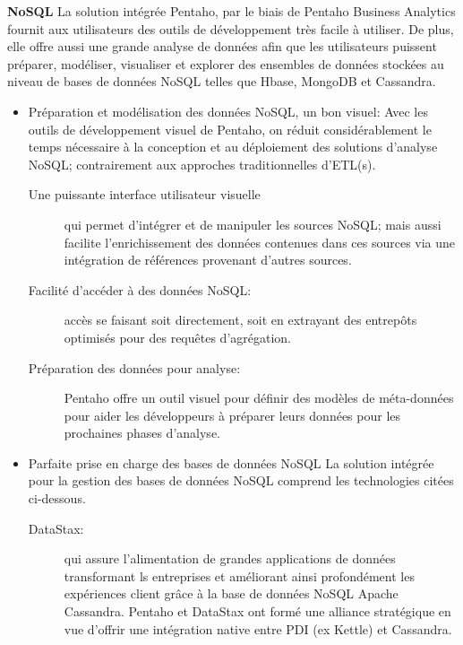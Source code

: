 \documentclass[12pt,a4wide,twoside]{report}
\begin{document}
 \textbf{NoSQL \newline}
 La solution intégrée Pentaho, par le biais de Pentaho Business Analytics fournit aux utilisateurs des outils de développement très facile à utiliser. De plus, elle offre aussi une grande analyse de données afin que les utilisateurs puissent préparer, modéliser, visualiser et explorer des ensembles de données stockées au niveau de bases de données NoSQL telles que Hbase, MongoDB et Cassandra.
 \begin{itemize}
 	\item Préparation et modélisation des données NoSQL, un bon visuel: \newline
 	Avec les outils de développement visuel de Pentaho, on réduit considérablement le temps nécessaire à la conception et au déploiement des solutions d'analyse NoSQL; contrairement aux approches traditionnelles d'ETL(s).
 
 \begin{description} 
\item[Une puissante interface utilisateur visuelle] qui permet d'intégrer et de manipuler les sources NoSQL; mais aussi facilite l'enrichissement des données contenues dans ces sources via une intégration de références provenant d'autres sources.

\item[Facilité d'accéder à des données NoSQL:] accès se faisant soit directement, soit en extrayant des entrepôts optimisés pour des requêtes d'agrégation.

\item[Préparation des données pour analyse: ]Pentaho offre un outil visuel pour définir des modèles de méta-données pour aider les développeurs à préparer leurs données pour les prochaines phases d'analyse. 
\end{description}

\item Parfaite prise en charge des bases de données NoSQL \newline
La solution intégrée pour la gestion des bases de données NoSQL comprend les technologies citées ci-dessous.


\begin{description} 

\item[DataStax:] qui assure l'alimentation de grandes applications de données transformant ls entreprises et améliorant ainsi profondément les expériences client grâce à la base de données NoSQL Apache Cassandra.\newline
Pentaho et DataStax ont formé une alliance stratégique en vue d'offrir une intégration native entre PDI (ex Kettle) et Cassandra. \cite{art4}



\end{description}
\end{itemize}
\end{document}
